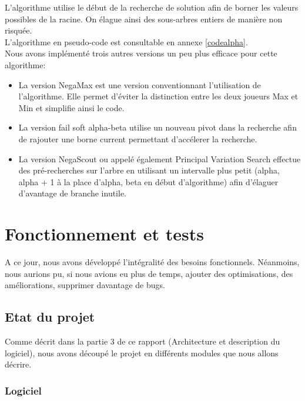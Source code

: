 \documentclass[a4paper,12pt]{report}
\begin{document}
L'algorithme utilise le début de la recherche de solution afin de borner les valeurs possibles de la racine. On élague ainsi des sous-arbres entiers de manière non risquée.\\

L'algorithme en pseudo-code est consultable en annexe \ref{codealpha}.\\

Nous avons implémenté trois autres versions un peu plus efficace pour cette algorithme:

\begin{itemize}
\item La version NegaMax est une version conventionnant l'utilisation de l'algorithme. Elle permet d'éviter la distinction entre les deux joueurs Max et Min et simplifie ainsi le code.

\item La version fail soft alpha-beta utilise un nouveau pivot dans la recherche afin de rajouter une borne current permettant d'accélerer la recherche.

\item La version NegaScout ou appelé également Principal Variation Search effectue des pré-recherches sur l'arbre en utilisant un intervalle plus petit (alpha, alpha + 1 à la place d'alpha, beta en début d'algorithme) afin d'élaguer d'avantage de branche inutile.

\end{itemize}


\chapter{Fonctionnement et tests}

A ce jour, nous avons développé l’intégralité des besoins fonctionnels. Néanmoins, nous aurions pu, si nous avions eu plus de temps, ajouter des optimisations, des améliorations, supprimer davantage de bugs.

\section{Etat du projet}

Comme décrit dans la partie 3 de ce rapport (Architecture et description du logiciel), nous avons découpé le projet en différents modules que nous allons décrire. 

\subsection{Logiciel}
\end{document}
